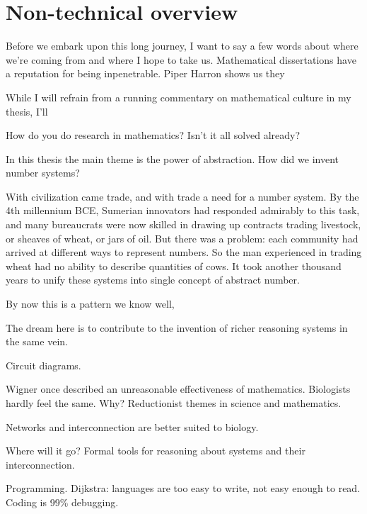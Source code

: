 {}
\chapter*{Non-technical overview}

Before we embark upon this long journey, I want to say a few words about where
we're coming from and where I hope to take us. Mathematical dissertations have a
reputation for being inpenetrable. Piper Harron shows us they 

While I will refrain from a running commentary on mathematical culture in my thesis, I'll 


How do you do research in mathematics? Isn't it all solved already?

In this thesis the main theme is the power of abstraction. How did we invent
number systems?

With civilization came trade, and with trade a need for a number system. By the 4th millennium BCE, Sumerian innovators had responded admirably to this task, and many bureaucrats were now skilled in drawing up contracts trading livestock, or sheaves of wheat, or jars of oil. But there was a problem: each community had arrived at different ways to represent numbers. So the man experienced in trading wheat had no ability to describe quantities of cows. It took another thousand years to unify these systems into single concept of abstract number.

By now this is a pattern we know well, 

The dream here is to contribute to the invention of richer reasoning systems in
the same vein.

Circuit diagrams.

Wigner once described an unreasonable effectiveness of mathematics. Biologists hardly feel the same.
Why? Reductionist themes in science and mathematics.

Networks and interconnection are better suited to biology.

Where will it go? Formal tools for reasoning about systems and their
interconnection.

Programming. Dijkstra: languages are too easy to write, not easy enough to read. Coding is 99\% debugging.
